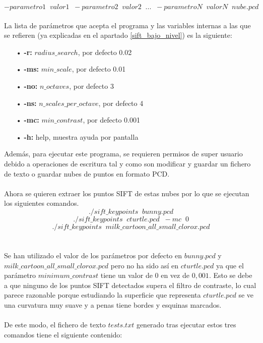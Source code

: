$$-parametro1 \;\; valor1 \;\; -parametro2 \;\; valor2 \;\; ... \;\; -parametroN \;\; valorN \;\; nube.pcd$$
\\
La lista de parámetros que acepta el programa y las variables internas a las que se refieren (ya explicadas en el apartado \ref{sift_bajo_nivel}) es la siguiente:
\begin{itemize}
\item[•]\textbf{-r:} $radius\_search$, por defecto 0.02
\item[•]\textbf{-ms:} $min\_scale$, por defecto 0.01
\item[•]\textbf{-no:} $n\_octaves$, por defecto 3
\item[•]\textbf{-ns:} $n\_scales\_per\_octave$, por defecto 4
\item[•]\textbf{-mc:} $min\_contrast$, por defecto 0.001
\item[•]\textbf{-h:} help, muestra ayuda por pantalla
\end{itemize}
Además, para ejecutar este programa, se requieren permisos de super usuario debido a operaciones de escritura tal y como son modificar y guardar un fichero de texto o guardar nubes de puntos en formato PCD.
\\
\\
Ahora se quieren extraer los puntos SIFT de estas nubes por lo que se ejecutan los siguientes comandos.
$$./sift\_keypoints\;\;bunny.pcd$$
$$./sift\_keypoints\;\;cturtle.pcd\;\;-mc\;\;0$$
$$./sift\_keypoints\;\;milk\_cartoon\_all\_small\_clorox.pcd$$
\\
\\
Se han utilizado el valor de los parámetros por defecto en $bunny.pcd$ y \\
$milk\_cartoon\_all\_small\_clorox.pcd$ pero no ha sido así en $cturtle.pcd$ ya que el parámetro $minimum\_contrast$ tiene un valor de $0$ en vez de $0,001$. Esto se debe a que ninguno de los puntos SIFT detectados supera el filtro de contraste, lo cual parece razonable porque estudiando la superficie que representa $cturtle.pcd$ se ve una curvatura muy suave y a penas tiene bordes y esquinas marcados.
\\
\\
De este modo, el fichero de texto $tests.txt$ generado tras ejecutar estos tres comandos tiene el siguiente contenido:

